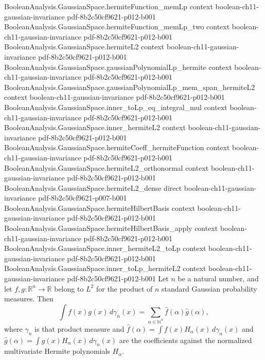 \begin{theorem}
\proofstep
  {BooleanAnalysis.GaussianSpace.hermiteFunction_memLp}
  {context}
  {boolean-ch11-gaussian-invariance}
  {pdf-8b2c50cf9621-p012-b001}
\proofstep
  {BooleanAnalysis.GaussianSpace.hermiteFunction_memLp_two}
  {context}
  {boolean-ch11-gaussian-invariance}
  {pdf-8b2c50cf9621-p012-b001}
\proofstep
  {BooleanAnalysis.GaussianSpace.hermiteL2}
  {context}
  {boolean-ch11-gaussian-invariance}
  {pdf-8b2c50cf9621-p012-b001}
\proofstep
  {BooleanAnalysis.GaussianSpace.gaussianPolynomialLp_hermite}
  {context}
  {boolean-ch11-gaussian-invariance}
  {pdf-8b2c50cf9621-p012-b001}
\proofstep
  {BooleanAnalysis.GaussianSpace.gaussianPolynomialLp_mem_span_hermiteL2}
  {context}
  {boolean-ch11-gaussian-invariance}
  {pdf-8b2c50cf9621-p012-b001}
\proofstep
  {BooleanAnalysis.GaussianSpace.inner_toLp_eq_integral_mul}
  {context}
  {boolean-ch11-gaussian-invariance}
  {pdf-8b2c50cf9621-p012-b001}
\proofstep
  {BooleanAnalysis.GaussianSpace.inner_hermiteL2}
  {context}
  {boolean-ch11-gaussian-invariance}
  {pdf-8b2c50cf9621-p012-b001}
\proofstep
  {BooleanAnalysis.GaussianSpace.hermiteCoeff_hermiteFunction}
  {context}
  {boolean-ch11-gaussian-invariance}
  {pdf-8b2c50cf9621-p012-b001}
\proofstep
  {BooleanAnalysis.GaussianSpace.hermiteL2_orthonormal}
  {context}
  {boolean-ch11-gaussian-invariance}
  {pdf-8b2c50cf9621-p012-b001}
\proofstep
  {BooleanAnalysis.GaussianSpace.hermiteL2_dense}
  {direct}
  {boolean-ch11-gaussian-invariance}
  {pdf-8b2c50cf9621-p007-b001}
\proofstep
  {BooleanAnalysis.GaussianSpace.hermiteHilbertBasis}
  {context}
  {boolean-ch11-gaussian-invariance}
  {pdf-8b2c50cf9621-p012-b001}
\proofstep
  {BooleanAnalysis.GaussianSpace.hermiteHilbertBasis_apply}
  {context}
  {boolean-ch11-gaussian-invariance}
  {pdf-8b2c50cf9621-p012-b001}
\proofstep
  {BooleanAnalysis.GaussianSpace.inner_hermiteL2_toLp}
  {context}
  {boolean-ch11-gaussian-invariance}
  {pdf-8b2c50cf9621-p012-b001}
\proofstep
  {BooleanAnalysis.GaussianSpace.inner_toLp_hermiteL2}
  {context}
  {boolean-ch11-gaussian-invariance}
  {pdf-8b2c50cf9621-p012-b001}
Let $n$ be a natural number, and let $f,g:\mathbb{R}^n\to\mathbb{R}$ belong to $L^2$ for
the product of $n$ standard Gaussian probability measures. Then
\[
\int f(x)g(x)\,d\gamma_n(x)=\sum_{\alpha\in\mathbb{N}^n}\widehat f(\alpha)\widehat
g(\alpha),
\]
where $\gamma_n$ is that product measure and $\widehat f(\alpha)=\int
f(x)H_\alpha(x)\,d\gamma_n(x)$ and $\widehat g(\alpha)=\int
g(x)H_\alpha(x)\,d\gamma_n(x)$ are the coefficients against the normalized multivariate
Hermite polynomials $H_\alpha$.
\end{theorem}

